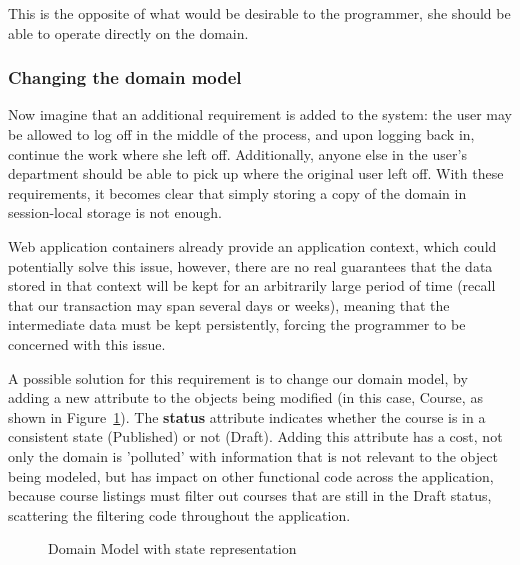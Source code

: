 \documentclass{llncs}
\begin{document}
This is the opposite of what would be desirable to the programmer, she
should be able to operate directly on the domain.

\subsubsection{Changing the domain model}

Now imagine that an additional requirement is added to the system: the
user may be allowed to log off in the middle of the process, and upon
logging back in, continue the work where she left off. Additionally,
anyone else in the user's department should be able to pick up where
the original user left off. With these requirements, it becomes clear
that simply storing a copy of the domain in session-local storage is
not enough.

Web application containers already provide an application context,
which could potentially solve this issue, however, there are no real
guarantees that the data stored in that context will be kept for an
arbitrarily large period of time (recall that our transaction may span
several days or weeks), meaning that the intermediate data must be
kept persistently, forcing the programmer to be concerned with this
issue.

A possible solution for this requirement is to change our domain
model, by adding a new attribute to the objects being modified (in
this case, Course, as shown in
Figure~\ref{fig:courseDomainState}). The {\bf status} attribute
indicates whether the course is in a consistent state (Published) or
not (Draft). Adding this attribute has a cost, not only the domain is
'polluted' with information that is not relevant to the object being
modeled, but has impact on other functional code across the
application, because course listings must filter out courses that are
still in the Draft status, scattering the filtering code throughout
the application.

\begin{figure}
  \centering

\caption{Domain Model with state representation}
\label{fig:courseDomainState}

\end{figure}
\end{document}
